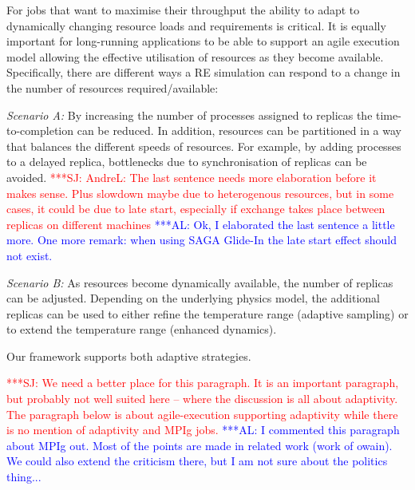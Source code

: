 \documentclass{rspublic}
\newcommand{\alnote}[1]{ {\textcolor{blue} { ***AL: #1 }}}
\newcommand{\jhanote}[1]{ {\textcolor{red} { ***SJ: #1 }}}
\newcommand{\alnote}[1]{}
\newcommand{\jhanote}[1]{}
\begin{document}
For jobs that want to maximise their throughput the ability to adapt
to dynamically changing resource loads and requirements is
critical. It is equally important for long-running applications to be
able to support an agile execution model allowing the effective
utilisation of resources as they become available.  Specifically,
there are different ways a RE simulation can respond to a change in
the number of resources required/available:
\begin{compactitem}         
\item {\it Scenario A:} By increasing the number of processes assigned
  to replicas the time-to-completion can be reduced. In addition,
  resources can be partitioned in a way that balances the different
  speeds of resources.  For example, by adding processes to a 
  delayed replica, bottlenecks due to synchronisation of replicas can
  be avoided.
  \jhanote{AndreL: The last sentence needs more elaboration before it
    makes sense. Plus slowdown maybe due to heterogenous resources,
    but in some cases, it could be due to late start, especially if
    exchange takes place between replicas on different machines}
  \alnote{Ok, I elaborated the last sentence a little more. One more
    remark: when using SAGA Glide-In the late start effect should not
    exist.}

\item {\it Scenario B:} As resources become dynamically available, the
  number of replicas can be adjusted. Depending on the underlying
  physics model, the additional replicas can be used to either refine
  the temperature range (adaptive sampling) or to extend the
  temperature range (enhanced dynamics).
\end{compactitem}           
Our framework supports both adaptive strategies.


\jhanote{We need a better place for this paragraph. It is an important
  paragraph, but probably not well suited here -- where the discussion
  is all about adaptivity. The paragraph below is about
  agile-execution supporting adaptivity while there is no mention of
  adaptivity and MPIg jobs.}
\alnote{I commented this paragraph about MPIg out. Most of the points are
made in related work (work of owain). We could also extend the criticism
there, but I am not sure about the politics thing...}  
\end{document}
